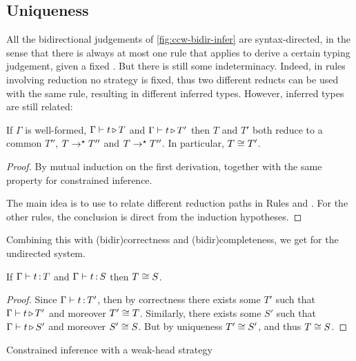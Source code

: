 \subsection{Uniqueness}

All the bidirectional judgements of \cref{fig:ccw-bidir-infer} are syntax-directed,
in the sense that there is always at most one rule that applies to derive a certain typing judgement, given a fixed .
But there is still some indeterminacy.
Indeed, in rules involving reduction no strategy is fixed, thus two different reducts can be used with the same rule, resulting in different inferred types.
However, inferred types are still related:

\begin{theorem}
  \label{thm:unique-inf}
  If $\Gamma$ is well-formed,
  $\Gamma \vdash t \operatorname{\triangleright} T$ and $\Gamma \vdash t \operatorname{\triangleright} T'$ then $T$ and $T'$ both reduce to a
  common $T''$, \eg $T \rightarrow^{\star} T''$ and $T \rightarrow^{\star} T''$. In particular, $T \cong T'$.
\end{theorem}

\begin{proof}
  By mutual induction on the first derivation, together with the same property for
  constrained inference.

  The main idea is to use  to relate different reduction paths in Rules
   and . For the other rules,
  the conclusion is direct from the induction hypotheses.
\end{proof}

Combining this with \kl(bidir){correctness} and \kl(bidir){completeness},
we get  for the undirected system.

\begin{theorem}
  \label{thm:unique-undir}
  If $\Gamma \vdash t \operatorname{:} T$ and $\Gamma \vdash t \operatorname{:} S$ then $T \cong S$.
\end{theorem}

\begin{proof}
  Since $\Gamma \vdash t \operatorname{:} T'$, then by correctness
  there exists some $T'$ such that $\Gamma \vdash t \operatorname{\triangleright} T'$ and moreover $T' \cong T$.
  Similarly, there exists some $S'$ such that $\Gamma \vdash t \operatorname{\triangleright} S'$
  and moreover $S' \cong S$.
  But by uniqueness $T' \cong S'$, and thus $T \cong S$.
\end{proof}

\begin{marginfigure}
\caption{Constrained inference with a weak-head strategy}
\label{fig:wh-pinf}
\end{marginfigure}

